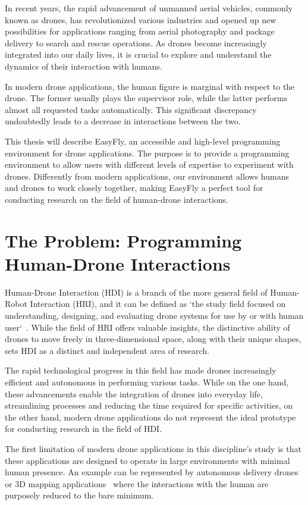 In recent years, the rapid advancement of unmanned aerial vehicles, commonly known as drones,
has revolutionized various industries and opened up new possibilities for applications ranging
from aerial photography and package delivery to search and rescue operations. As drones become
increasingly integrated into our daily lives, it is crucial to explore and understand the dynamics
of their interaction with humans.

In modern drone applications, the human figure is marginal with respect to the drone.
The former usually plays the supervisor role, while the latter performs almost all requested tasks automatically.
This significant discrepancy undoubtedly leads to a decrease in interactions between the two.

This thesis will describe EasyFly, an accessible and high-level programming environment for drone applications.
The purpose is to provide a programming environment to allow users with different levels of expertise to experiment with drones. 
Differently from modern applications, our environment allows humans and drones to work closely together,
making EasyFly a perfect tool for conducting research on the field of human-drone interactions.


\section{The Problem: Programming Human-Drone Interactions}\label{sec:the_problem}
Human-Drone Interaction (HDI) is a branch of the more general field of Human-Robot Interaction (HRI), and it can be defined as 
`the study field focused on understanding, designing, and evaluating drone systems for use by or with human user`~\cite{tezza2019hdi}.
While the field of HRI offers valuable insights, the distinctive ability of drones to move freely in three-dimensional
space, along with their unique shapes, sets HDI as a distinct and independent area of research.

The rapid technological progress in this field has made drones increasingly efficient and autonomous in performing various
tasks. While on the one hand, these advancements enable the integration of drones into everyday life, streamlining processes
and reducing the time required for specific activities, on the other hand, modern drone applications do not represent the
ideal prototype for conducting research in the field of HDI.

The first limitation of modern drone applications in this discipline's study is that these applications are designed
to operate in large environments with minimal human presence. An example can be represented by autonomous delivery
drones~\cite{singireddy2018primeAir} or 3D mapping applications~\cite{nex3Dmapping} where the interactions with the human are purposely
reduced to the bare minimum.

